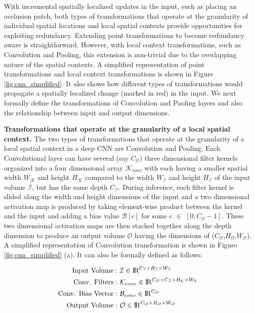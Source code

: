 With incremental spatially localized updates in the input, such as placing an occlusion patch, both types of transformations that operate at the granularity of individual spatial locations and local spatial contexts provide opportunities for exploiting redundancy.
Extending point transformations to become redundancy aware is straightforward. However, with local context transformations, such as Convolution and Pooling, this extension is non-trivial due to the overlapping nature of the spatial contexts. A simplified representation of point transformations and local context transformations is shown in Figure \ref{fig:cnn_simplified}.
It also shows how different types of transformations would propagate a spatially localized change (marked in red) in the input.
We next formally define the transformations of Convolution and Pooling layers and also the relationship between input and output dimensions.

\vspace{2mm}
\noindent \textbf{Transformations that operate at the granularity of a local spatial context.} The two types of transformations that operate at the granularity of a local spatial context in a deep CNN are Convolution and Pooling.
Each Convolutional layer can have several (say $C_{\mathcal{O}}$) three dimensional filter kernels organized into a four dimensional array $\mathcal{K}_{conv}$ with each having a smaller spatial width $W_\mathcal{K}$ and height $H_\mathcal{K}$ compared to the width $W_{\mathcal{I}}$ and height $H_{\mathcal{I}}$ of the input volume $\mathcal{I}$, but has the same depth $C_{\mathcal{I}}$.
During inference, each filter kernel is slided along the width and height dimensions of the input and a two dimensional activation map is produced by taking element-wise product between the kernel and the input and adding a bias value $\mathcal{B}[c]$ for some c $\in$ $[0, C_{\mathcal{O}}-1]$.
These two dimensional activation maps are then stacked together along the depth dimension to produce an output volume $\mathcal{O}$ having the dimensions of ($C_{\mathcal{O}}$,$H_{\mathcal{O}}$,$W_{\mathcal{O}}$).
A simplified representation of Convolution transformation is shown in Figure \ref{fig:cnn_simplified} (a).
It can also be formally defined as follows:

\begin{align}
\begin{split}
\text{Input Volume}:&~ \mathcal{I} \in \mathcal{\rm I\!R}^{C_{\mathcal{I}} \times H_{\mathcal{I}} \times W_{\mathcal{I}}}\\
\text{Conv. Filters}:&~ \mathcal{K}_{conv} \in \mathcal{\rm I\!R}^{C_{\mathcal{O}} \times C_{\mathcal{I}} \times H_{\mathcal{K}} \times W_{\mathcal{K}}}\\
\text{Conv. Bias Vector}:&~ \mathcal{B}_{conv} \in \mathcal{\rm I\!R}^{C_{\mathcal{O}}}\\
\text{Output Volume}:&~ \mathcal{O} \in \mathcal{\rm I\!R}^{C_{\mathcal{O}} \times H_{\mathcal{O}} \times W_{\mathcal{O}}}
\end{split}
\end{align}

